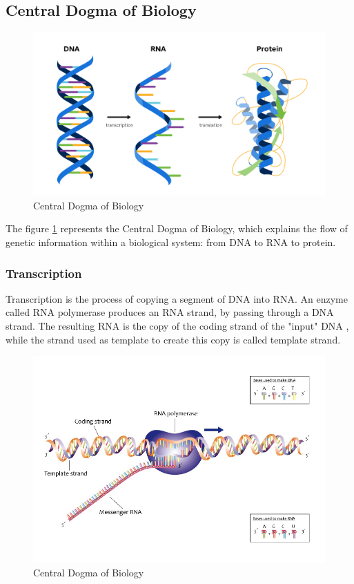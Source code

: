 \subsection{Central Dogma of Biology}
\label{sec:central-dogma}
\begin{figure}[h!]
	\includegraphics[scale=.27]{res/proteins_overview/central_dogma.png}
	\centering
	\caption{Central Dogma of Biology}
	\label{fig:central-dogma}
\end{figure}

The figure \ref{fig:central-dogma} represents the Central Dogma of Biology, which explains the flow of genetic information within a biological system: from DNA to RNA to protein.

\pagebreak

\subsubsection{Transcription}
Transcription is the process of copying a segment of DNA into RNA. An enzyme called RNA polymerase produces an RNA strand, by passing through a DNA strand. The resulting RNA is the copy of the coding strand of the "input" DNA , while the strand used as template to create this copy is called template strand.

\begin{figure}[h!]
	\includegraphics[scale=.6]{res/proteins_overview/rna_polymerase.jpeg}
	\centering
	\caption{Central Dogma of Biology}
	\label{fig:transcription}
\end{figure}

